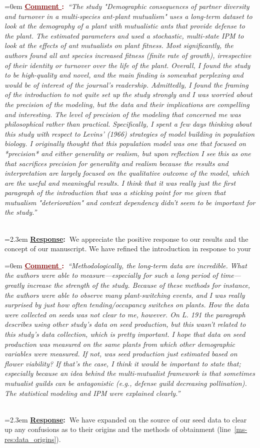\documentclass[12pt]{article}
\newcounter{cN}
\newcommand{\comment}[1]{
	\vspace{2em}
	\refstepcounter{cN} %
	\noindent \hangindent=0em \textbf{\textcolor{Maroon}{\uline{Comment \thecN}:~}}\emph{``#1''}
	}
\newcommand{\response}[1]{
	\\[0.25em]
	\hangindent=2.3em \textbf{\textcolor{NavyBlue}{\uline{Response}:~}}#1
	}
\begin{document}
\comment{The study "Demographic consequences of partner diversity and turnover in a multi-species ant-plant mutualism" uses a long-term dataset to look at the demography of a plant with mutualistic ants that provide defense to the plant. 
The estimated parameters and used a stochastic, multi-state IPM to look at the effects of ant mutualists on plant fitness. 
Most significantly, the authors found all ant species increased fitness (finite rate of growth), irrespective of their identity or turnover over the life of the plant. 
Overall, I found the study to be high-quality and novel, and the main finding is somewhat perplexing and would be of interest of the journal's readership. 
Admittedly, I found the framing of the introduction to not quite set up the study strongly and I was worried about the precision of the modeling, but the data and their implications are compelling and interesting. 
The level of precision of the modeling that concerned me was philosophical rather than practical. 
Specifically, I spent a few days thinking about this study with respect to Levins' (1966) strategies of model building in population biology. 
I originally thought that this population model was one that focused on *precision* and either generality or realism, but upon reflection I see this as one that sacrifices precision for generality and realism because the results and interpretation are largely focused on the qualitative outcome of the model, which are the useful and meaningful results. 
I think that it was really just the first paragraph of the introduction that was a sticking point for me given that mutualism "deterioration" and context dependency didn't seem to be important for the study.}
\response{We appreciate the positive response to our results and the concept of our manuscript. We have refined the introduction in response to your  }

\comment{Methodologically, the long-term data are incredible. 
What the authors were able to measure—especially for such a long period of time—greatly increase the strength of the study. 
Because of these methods for instance, the authors were able to observe many plant-switching events, and I was really surprised by just how often tending/occupancy switches on plants. 
How the data were collected on seeds was not clear to me, however. 
On L. 191 the paragraph describes using other study's data on seed production, but this wasn't related to this study's data collection, which is pretty important. 
I hope that data on seed production was measured on the same plants from which other demographic variables were measured. 
If not, was seed production just estimated based on flower viability?  
If that's the case, I think it would be important to state that; especially because an idea behind the multi-mutualist framework is that sometimes mutualist guilds can be antagonistic (e.g., defense guild decreasing pollination). 
The statistical modeling and IPM were explained clearly.}
\response{We have expanded on the source of our seed data to clear up any confusions as to their origins and the methods of obtainment (line~\ref{ms-res:data_origins}). }
\end{document}
